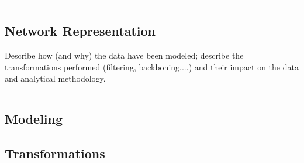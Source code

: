 {\color{gray}\hrule}
\begin{center}
\section{Network Representation}

Describe how (and why) the data have been modeled; describe the transformations performed (filtering, backboning,...) and their impact on the data and analytical methodology.
\bigskip
\end{center}
{\color{gray}\hrule}
\begin{multicols}{2}
\subsection{Modeling}

\subsection{Transformations}

\end{multicols}


